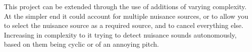 \label{scope}
This project can be extended through the use of additions of varying complexity. At the simpler end it could account for multiple nuisance sources, or to allow you to select the nuisance source as a required source, and to cancel everything else. Increasing in complexity to it trying to detect nuisance sounds autonomously, based on them being cyclic or of an annoying pitch.

